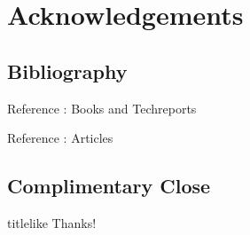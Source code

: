 \documentclass[english]{pkuslide}
\begin{document}
\section{Acknowledgements}
\frame{\sectionpage}
\subsection{Bibliography}
	\begin{frame}{Reference : Books and Techreports}
\printbibliography[type = book]
\printbibliography[keyword = aaa]
	\end{frame}
\begin{frame}{Reference : Articles}
\printbibliography[type = article]
	\end{frame}

\subsection{Complimentary Close}

	\begin{frame}
\LARGE
\begin{beamercolorbox}[center, ht=3em]{titlelike}
\vspace{1em}
Thanks!
\end{beamercolorbox}
	\end{frame}

	
\end{document}
